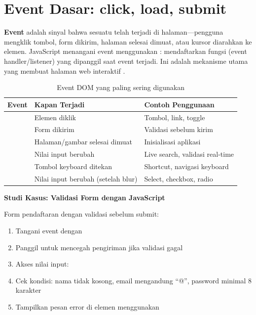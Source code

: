 ﻿\section{Event Dasar: click, load, submit}

\textbf{Event} adalah sinyal bahwa sesuatu telah terjadi di halaman---pengguna mengklik tombol, form dikirim, halaman selesai dimuat, atau kursor diarahkan ke elemen. JavaScript menangani event menggunakan : mendaftarkan fungsi (event handler/listener) yang dipanggil saat event terjadi. Ini adalah mekanisme utama yang membuat halaman web interaktif \cite{jsInfo}.

\begin{table}[H]
\centering
\begin{tabular}{|P{2.5cm}|P{3.5cm}|P{6cm}|}
\hline
\textbf{Event} & \textbf{Kapan Terjadi} & \textbf{Contoh Penggunaan} \\
\hline
{} & Elemen diklik & Tombol, link, toggle \\
\hline
{} & Form dikirim & Validasi sebelum kirim \\
\hline
{} & Halaman/gambar selesai dimuat & Inisialisasi aplikasi \\
\hline
{} & Nilai input berubah & Live search, validasi real-time \\
\hline
{} & Tombol keyboard ditekan & Shortcut, navigasi keyboard \\
\hline
{} & Nilai input berubah (setelah blur) & Select, checkbox, radio \\
\hline
\end{tabular}
\caption{Event DOM yang paling sering digunakan}
\end{table}

\begin{contoh}
\textbf{Studi Kasus: Validasi Form dengan JavaScript}

Form pendaftaran dengan validasi sebelum submit:
\begin{enumerate}
  \item Tangani event  dengan 
  \item Panggil  untuk mencegah pengiriman jika validasi gagal
  \item Akses nilai input: 
  \item Cek kondisi: nama tidak kosong, email mengandung ``@'', password minimal 8 karakter
  \item Tampilkan pesan error di elemen  menggunakan 
\end{enumerate}
\end{contoh}

